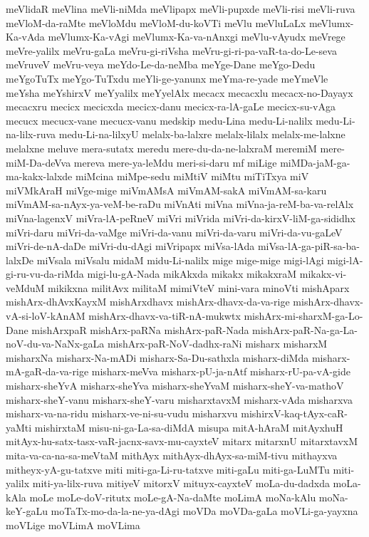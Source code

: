 {meVlidaR
meVlina
meVli-niMda
meVlipapx
meVli-pupxde
meVli-risi
meVli-ruva
meVloM-da-raMte
meVloMdu
meVloM-du-koVTi
meVlu
meVluLaLx
meVlumx-Ka-vAda
meVlumx-Ka-vAgi
meVlumx-Ka-va-nAnxgi
meVlu-vAyudx
meVrege
meVre-yalilx
meVru-gaLa
meVru-gi-riVsha
meVru-gi-ri-pa-vaR-ta-do-Le-seva
meVruveV
meVru-veya
meYdo-Le-da-neMba
meYge-Dane
meYgo-Dedu
meYgoTuTx
meYgo-TuTxdu
meYli-ge-yanunx
meYma-re-yade
meYmeVle
meYsha
meYshirxV
meYyalilx
meYyelAlx
mecacx
mecacxlu
mecacx-no-Dayayx
mecacxru
mecicx
mecicxda
mecicx-danu
mecicx-ra-lA-gaLe
mecicx-su-vAga
mecucx
mecucx-vane
mecucx-vanu
medskip
medu-Lina
medu-Li-nalilx
medu-Li-na-lilx-ruva
medu-Li-na-lilxyU
melalx-ba-lalxre
melalx-lilalx
melalx-me-lalxne
melalxne
meluve
mera-sutatx
meredu
mere-du-da-ne-lalxraM
meremiM
mere-miM-Da-deVva
mereva
mere-ya-leMdu
meri-si-daru
mf
miLige
miMDa-jaM-ga-ma-kakx-lalxde
miMcina
miMpe-sedu
miMtiV
miMtu
miTiTxya
miV
miVMkAraH
miVge-mige
miVmAMsA
miVmAM-sakA
miVmAM-sa-karu
miVmAM-sa-nAyx-ya-veM-be-raDu
miVnAti
miVna
miVna-ja-reM-ba-va-relAlx
miVna-lagenxV
miVra-lA-peRneV
miVri
miVrida
miVri-da-kirxV-liM-ga-sididhx
miVri-daru
miVri-da-vaMge
miVri-da-vanu
miVri-da-varu
miVri-da-vu-gaLeV
miVri-de-nA-daDe
miVri-du-dAgi
miVripapx
miVsa-lAda
miVsa-lA-ga-piR-sa-ba-lalxDe
miVsala
miVsalu
midaM
midu-Li-nalilx
mige
mige-mige
migi-lAgi
migi-lA-gi-ru-vu-da-riMda
migi-lu-gA-Nada
mikAkxda
mikakx
mikakxraM
mikakx-vi-veMduM
mikikxna
militAvx
militaM
mimiVteV
mini-vara
minoVti
mishAparx
mishArx-dhAvxKayxM
mishArxdhavx
mishArx-dhavx-da-va-rige
mishArx-dhavx-vA-si-loV-kAnAM
mishArx-dhavx-va-tiR-nA-mukwtx
mishArx-mi-sharxM-ga-Lo-Dane
mishArxpaR
mishArx-paRNa
mishArx-paR-Nada
mishArx-paR-Na-ga-La-noV-du-va-NaNx-gaLa
mishArx-paR-NoV-dadhx-raNi
misharx
misharxM
misharxNa
misharx-Na-mADi
misharx-Sa-Du-sathxla
misharx-diMda
misharx-mA-gaR-da-va-rige
misharx-meVva
misharx-pU-ja-nAtf
misharx-rU-pa-vA-gide
misharx-sheYvA
misharx-sheYva
misharx-sheYvaM
misharx-sheY-va-mathoV
misharx-sheY-vanu
misharx-sheY-varu
misharxtavxM
misharx-vAda
misharxva
misharx-va-na-ridu
misharx-ve-ni-su-vudu
misharxvu
mishirxV-kaq-tAyx-caR-yaMti
mishirxtaM
misu-ni-ga-La-sa-diMdA
misupa
mitA-hAraM
mitAyxhuH
mitAyx-hu-satx-tasx-vaR-jacnx-savx-mu-cayxteV
mitarx
mitarxnU
mitarxtavxM
mita-va-ca-na-sa-meVtaM
mithAyx
mithAyx-dhAyx-sa-miM-tivu
mithayxva
mitheyx-yA-gu-tatxve
miti
miti-ga-Li-ru-tatxve
miti-gaLu
miti-ga-LuMTu
miti-yalilx
miti-ya-lilx-ruva
mitiyeV
mitorxV
mituyx-cayxteV
moLa-du-dadxda
moLa-kAla
moLe
moLe-doV-ritutx
moLe-gA-Na-daMte
moLimA
moNa-kAlu
moNa-keY-gaLu
moTaTx-mo-da-la-ne-ya-dAgi
moVDa
moVDa-gaLa
moVLi-ga-yayxna
moVLige
moVLimA
moVLima
}
